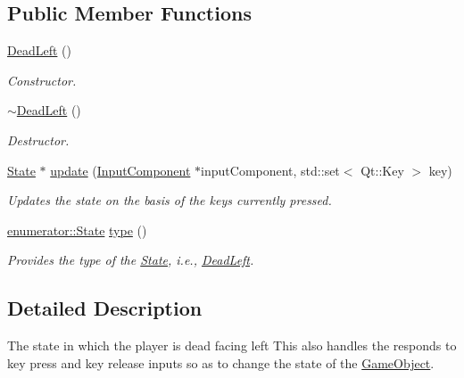 \subsection*{Public Member Functions}
\begin{DoxyCompactItemize}
\item 
\hypertarget{classDeadLeft_ad1149774bf2977166a9ceffa51c45c17}{\hyperlink{classDeadLeft_ad1149774bf2977166a9ceffa51c45c17}{Dead\-Left} ()}\label{classDeadLeft_ad1149774bf2977166a9ceffa51c45c17}

\begin{DoxyCompactList}\small\item\em Constructor. \end{DoxyCompactList}\item 
\hypertarget{classDeadLeft_a8706b3c84e6916d3c863c47c7fa51584}{\hyperlink{classDeadLeft_a8706b3c84e6916d3c863c47c7fa51584}{$\sim$\-Dead\-Left} ()}\label{classDeadLeft_a8706b3c84e6916d3c863c47c7fa51584}

\begin{DoxyCompactList}\small\item\em Destructor. \end{DoxyCompactList}\item 
\hyperlink{classState}{State} $\ast$ \hyperlink{classDeadLeft_a641116efda392a1c6437e9034443a1ea}{update} (\hyperlink{classInputComponent}{Input\-Component} $\ast$input\-Component, std\-::set$<$ Qt\-::\-Key $>$ key)
\begin{DoxyCompactList}\small\item\em Updates the state on the basis of the keys currently pressed. \end{DoxyCompactList}\item 
\hyperlink{namespaceenumerator_a5fc7b342c2c633e1037b07cea237a222}{enumerator\-::\-State} \hyperlink{classDeadLeft_a564f47ceebef43f5553072c446b3c12f}{type} ()
\begin{DoxyCompactList}\small\item\em Provides the type of the \hyperlink{classState}{State}, i.\-e., \hyperlink{classDeadLeft}{Dead\-Left}. \end{DoxyCompactList}\end{DoxyCompactItemize}


\subsection{Detailed Description}
The state in which the player is dead facing left This also handles the responds to key press and key release inputs so as to change the state of the \hyperlink{classGameObject}{Game\-Object}. 

